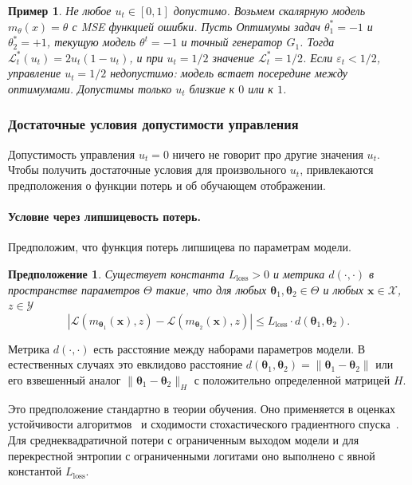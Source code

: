 \documentclass[a4paper,14pt,oneside,openany]{extarticle}
\newtheorem{assumption}{Предположение}
\newtheorem*{example}{Пример}
\newcommand{\bx}{\mathbf{x}}
\newcommand{\cL}{\mathcal{L}}
\newcommand{\cX}{\mathcal{X}}
\newcommand{\cY}{\mathcal{Y}}
\newcommand{\btheta}{\boldsymbol{\theta}}
\begin{document}
\begin{example}\label{ex:not_admissible_half}
    Не любое $u_t \in [0, 1]$ допустимо. Возьмем скалярную модель $m_{\theta}(x) = \theta$ с MSE функцией ошибки. Пусть Оптимумы задач $\theta^*_1 = -1$ и $\theta^*_2 = +1$, текущую модель $\theta^t = -1$ и точный генератор $G_1$. Тогда $\cL^*_t(u_t) = 2 u_t(1 - u_t)$, и при $u_t = 1/2$ значение $\cL^*_t = 1/2$. Если $\varepsilon_t < 1/2$, управление $u_t = 1/2$ недопустимо: модель встает посередине между оптимумами. Допустимы только $u_t$ близкие к $0$ или к $1$.
\end{example}

\subsubsection{Достаточные условия допустимости управления}

Допустимость управления $u_t = 0$ ничего не говорит про другие значения $u_t$. Чтобы получить достаточные условия для произвольного $u_t$, привлекаются предположения о функции потерь и об обучающем отображении.

\paragraph{Условие через липшицевость потерь.}
Предположим, что функция потерь липшицева по параметрам модели.

\begin{assumption}\label{ass:lipschitz_gr}
    Существует константа $L_{\text{loss}} > 0$ и метрика $d(\cdot, \cdot)$ в пространстве параметров $\Theta$ такие, что для любых $\btheta_1, \btheta_2 \in \Theta$ и любых $\bx \in \cX$, $z \in \cY$
    \[
        |\cL(m_{\btheta_1}(\bx), z) - \cL(m_{\btheta_2}(\bx), z)| \le L_{\text{loss}} \cdot d(\btheta_1, \btheta_2).
    \]
\end{assumption}

Метрика $d(\cdot, \cdot)$ есть расстояние между наборами параметров модели. В естественных случаях это евклидово расстояние $d(\btheta_1, \btheta_2) = \|\btheta_1 - \btheta_2\|$ или его взвешенный аналог $\|\btheta_1 - \btheta_2\|_H$ с положительно определенной матрицей $H$.

Это предположение стандартно в теории обучения. Оно применяется в оценках устойчивости алгоритмов~\cite{bousquet2002stability} и сходимости стохастического градиентного спуска~\cite{hardt2016train}. Для среднеквадратичной потери с ограниченным выходом модели и для перекрестной энтропии с ограниченными логитами оно выполнено с явной константой $L_{\text{loss}}$.
\end{document}
